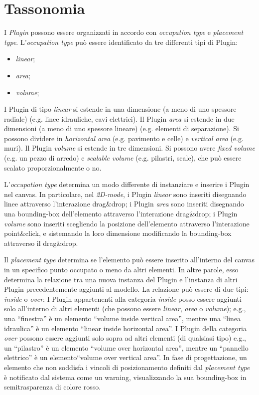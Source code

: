\section{Tassonomia}
\label{sec:chapter_3_section_2}

\noindent
I \emph{Plugin} possono essere organizzati in accordo con \emph{occupation type} e \emph{placement type}.
L'\emph{occupation type} può essere identificato da tre differenti tipi di Plugin:
\begin{itemize}
  \item \emph{linear};
  \item \emph{area};
  \item \emph{volume};
\end{itemize}
I Plugin di tipo \emph{linear} si estende in una dimensione (a meno di uno spessore radiale) (e.g. linee idrauliche, cavi elettrici).
Il Plugin \emph{area} si estende in due dimensioni (a meno di uno spessore lineare) (e.g. elementi di separazione).
Si possono dividere in \emph{horizontal area} (e.g. pavimento e celle) e \emph{vertical area} (e.g. muri).
Il Plugin \emph{volume} si estende in tre dimensioni. Si possono avere \emph{fixed volume} (e.g. un pezzo di arredo) e
\emph{scalable volume} (e.g. pilastri, scale), che può essere scalato proporzionalmente o no.


L'\emph{occupation type} determina un modo differente di instanziare e inserire i Plugin nel canvas.
In particolare, nel \emph{2D-mode}, i Plugin \emph{linear} sono inseriti disegnando linee attraverso l'interazione drag\&drop;
i Plugin \emph{area} sono inseriti disegnando una bounding-box dell'elemento attraverso l'interazione drag\&drop;
i Plugin \emph{volume} sono inseriti scegliendo la posizione dell'elemento attraverso l'interazione point\&click,
e sistemando la loro dimensione modificando la bounding-box attraverso il drag\&drop.


Il \emph{placement type} determina se l'elemento può essere inserito all'interno del canvas in un specifico punto occupato o meno
da altri elementi. In altre parole, esso determina la relazione tra una nuova instanza del Plugin e l'instanza di altri
Plugin precedentemente aggiunti al modello. La relazione può essere di due tipi: \emph{inside} o \emph{over}.
I Plugin appartenenti alla categoria \emph{inside} posso essere aggiunti solo all'interno di altri elementi (che possono essere
\emph{linear}, \emph{area} o \emph{volume}); e.g., una ``finestra'' è un elemento ``volume inside vertical area'',
mentre una ``linea idraulica'' \`e un elemento ``linear inside horizontal area''.
I Plugin della categoria \emph{over} possono essere aggiunti solo sopra ad altri elementi (di qualsiasi tipo)
e.g., un ``pilastro'' \`e un elemento ``volume over horizontal area'',
mentre un ``pannello elettrico'' è un elemento``volume over vertical area''.
In fase di progettazione, un elemento che non soddisfa i vincoli di posizionamento definiti dal \emph{placement type} \`e
notificato dal sistema come un warning, visualizzando la sua bounding-box in semitrasparenza di colore rosso.
\newpage
